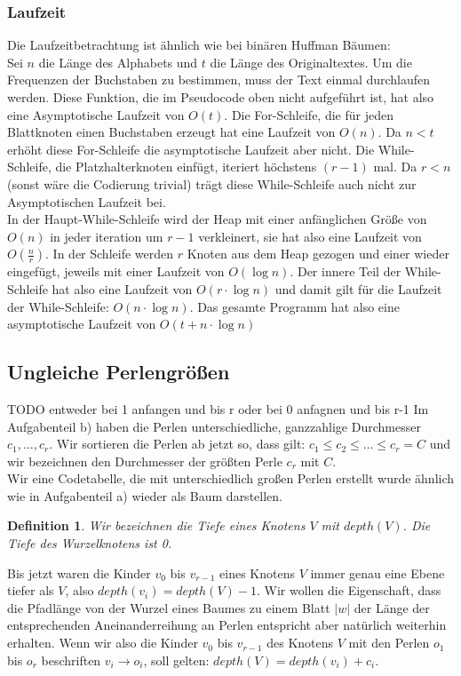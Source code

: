 \documentclass[a4paper,10pt,ngerman]{scrartcl}
\newtheorem{definition}[satz]{Definition}
\begin{document}
    \subsubsection{Laufzeit}
    Die Laufzeitbetrachtung ist ähnlich wie bei binären Huffman Bäumen:\\ %
    Sei $n$ die Länge des Alphabets und $t$ die Länge des Originaltextes.
    Um die Frequenzen der Buchstaben zu bestimmen, muss der Text einmal durchlaufen werden.
    Diese Funktion, die im Pseudocode oben nicht aufgeführt ist, hat also eine Asymptotische Laufzeit von $O(t)$.
    Die For-Schleife, die für jeden Blattknoten einen Buchstaben erzeugt hat eine Laufzeit von $O(n)$. Da $n < t$ erhöht diese For-Schleife die asymptotische Laufzeit aber nicht.
    Die While-Schleife, die Platzhalterknoten einfügt, iteriert höchstens $(r-1)$ mal. Da $r < n$ (sonst wäre die Codierung trivial) trägt diese While-Schleife auch nicht zur Asymptotischen Laufzeit bei.\\
    In der Haupt-While-Schleife wird der Heap mit einer anfänglichen Größe von $O(n)$ in jeder iteration um $r-1$ verkleinert, sie hat also eine Laufzeit von $O(\frac n r)$.
    In der Schleife werden $r$ Knoten aus dem Heap gezogen und einer wieder eingefügt, jeweils mit einer Laufzeit von $O(\log n)$.
    Der innere Teil der While-Schleife hat also eine Laufzeit von $O(r \cdot \log n)$ und damit gilt für die Laufzeit der While-Schleife: $O(n \cdot \log n)$.
    Das gesamte Programm hat also eine asymptotische Laufzeit von $O(t + n \cdot \log n)$

    \subsection{Ungleiche Perlengrößen}
    TODO entweder bei 1 anfangen und bis r oder bei 0 anfagnen und bis r-1
    Im Aufgabenteil b) haben die Perlen unterschiedliche, ganzzahlige Durchmesser $c_1, \dots, c_r$. Wir sortieren die Perlen ab jetzt so, dass gilt: $c_1 \le c_2 \le \dots \le c_r = C$ und wir bezeichnen den Durchmesser der größten Perle $c_r$ mit $C$. \\
    Wir eine Codetabelle, die mit unterschiedlich großen Perlen erstellt wurde ähnlich wie in Aufgabenteil a) wieder als Baum darstellen.
    \begin{definition}
        Wir bezeichnen die Tiefe eines Knotens $V$ mit $depth(V)$. Die Tiefe des Wurzelknotens ist 0.
    \end{definition}
    Bis jetzt waren die Kinder $v_0$ bis $v_{r-1}$ eines Knotens $V$ immer genau eine Ebene tiefer als $V$, also $depth(v_i) = depth(V) - 1$.
    Wir wollen die Eigenschaft, dass die Pfadlänge von der Wurzel eines Baumes zu einem Blatt $|w|$ der Länge der entsprechenden Aneinanderreihung an Perlen entspricht aber natürlich weiterhin erhalten. Wenn wir also die Kinder $v_0$ bis $v_{r-1}$ des Knotens $V$ mit den Perlen $o_1$ bis $o_{r}$ beschriften $v_i \to o_i$, soll gelten: $depth(V) = depth(v_i) + c_i$.
\end{document}
